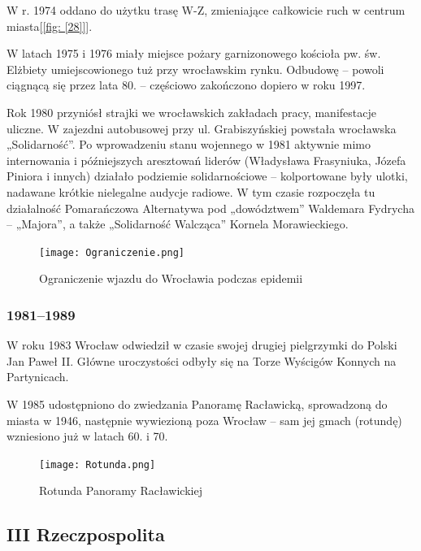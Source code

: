 \documentclass{article}
\begin{document}
W r. 1974 oddano do użytku trasę W-Z, zmieniające całkowicie ruch w centrum miasta[\ref{fig: [28]}].

W latach 1975 i 1976 miały miejsce pożary garnizonowego kościoła pw. św. Elżbiety umiejscowionego tuż przy wrocławskim rynku. Odbudowę – powoli ciągnącą się przez lata 80. – częściowo zakończono dopiero w roku 1997.

Rok 1980 przyniósł strajki we wrocławskich zakładach pracy, manifestacje uliczne. W zajezdni autobusowej przy ul. Grabiszyńskiej powstała wrocławska „Solidarność”. Po wprowadzeniu stanu wojennego w 1981 aktywnie mimo internowania i późniejszych aresztowań liderów (Władysława Frasyniuka, Józefa Piniora i innych) działało podziemie solidarnościowe – kolportowane były ulotki, nadawane krótkie nielegalne audycje radiowe. W tym czasie rozpoczęła tu działalność Pomarańczowa Alternatywa pod „dowództwem” Waldemara Fydrycha – „Majora”, a także „Solidarność Walcząca” Kornela Morawieckiego.


\begin{center}
\begin{figure}[h]
	\centering
	\texttt{[image: Ograniczenie.png]}
	\caption{Ograniczenie wjazdu do Wrocławia podczas epidemii}
\end{figure}
\end{center}

\newpage
\subsubsection {1981–1989}

W roku 1983 Wrocław odwiedził w czasie swojej drugiej pielgrzymki do Polski Jan Paweł II. Główne uroczystości odbyły się na Torze Wyścigów Konnych na Partynicach.

W 1985 udostępniono do zwiedzania Panoramę Racławicką, sprowadzoną do miasta w 1946, następnie wywiezioną poza Wrocław – sam jej gmach (rotundę) wzniesiono już w latach 60. i 70.


\begin{center}
\begin{figure}[h]
	\centering
	\texttt{[image: Rotunda.png]}
	\caption{Rotunda Panoramy Racławickiej}
\end{figure}
\end{center}

\subsection {III Rzeczpospolita}
\end{document}
